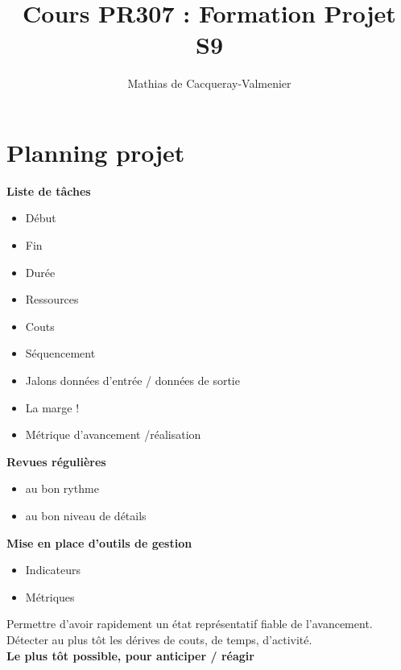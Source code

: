 \documentclass[10pt,a4paper]{article}
\title{Cours PR307 : Formation Projet S9}
\author{Mathias de Cacqueray-Valmenier }
\begin{document}
\maketitle

\begin{figure}[ht]
\begin{center}
\end{center}
\end{figure}


\newpage

\tableofcontents

\newpage

\section{Planning projet}
\textbf{Liste de tâches}
\begin{itemize}
\item Début
\item Fin
\item Durée
\item Ressources
\item Couts
\item Séquencement
\item Jalons données d'entrée / données de sortie
\item La marge !
\item Métrique d'avancement /réalisation
\end{itemize}
\textbf{Revues régulières}
\begin{itemize}
\item au bon rythme
\item au bon niveau de détails
\end{itemize}
\textbf{Mise en place d'outils de gestion}
\begin{itemize}
\item Indicateurs
\item Métriques
\end{itemize}
Permettre d'avoir rapidement un état représentatif fiable de l'avancement.\\
Détecter au plus tôt les dérives de couts, de temps, d'activité.\\
\textbf{Le plus tôt possible, pour anticiper / réagir}
\end{document}
